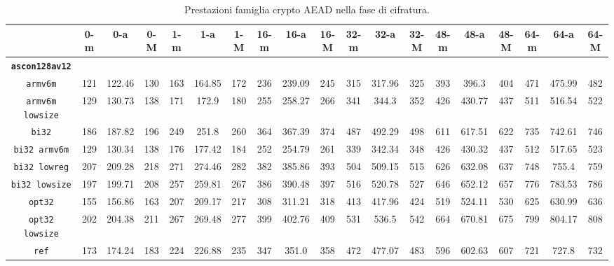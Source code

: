 \begin{landscape}
    \begin{table}[]
        \caption{Prestazioni famiglia crypto AEAD nella fase di cifratura.}
        \begin{adjustbox}{width=600pt}
            \centering
			\begin{tabular}{|c|c|c|c|c|c|c|c|c|c|c|c|c|c|c|c|c|c|c|}
				\hline
				& \textbf{0-m} & \textbf{0-a} & \textbf{0-M} & \textbf{1-m} & \textbf{1-a} & \textbf{1-M} & \textbf{16-m} & \textbf{16-a} & \textbf{16-M} & \textbf{32-m} & \textbf{32-a} & \textbf{32-M} & \textbf{48-m} & \textbf{48-a} & \textbf{48-M} & \textbf{64-m} & \textbf{64-a} & \textbf{64-M} \\
				\hline
				\texttt{\textbf{ascon128av12}} & & & & & & & & & & & & & & & & & & \\
				\hline
				\texttt{armv6m} & 121 & 122.46 & 130 & 163 & 164.85 & 172 & 236 & 239.09 & 245 & 315 & 317.96 & 325 & 393 & 396.3 & 404 & 471 & 475.99 & 482 \\
				\hline
				\texttt{armv6m lowsize} & 129 & 130.73 & 138 & 171 & 172.9 & 180 & 255 & 258.27 & 266 & 341 & 344.3 & 352 & 426 & 430.77 & 437 & 511 & 516.54 & 522 \\
				\hline
				\texttt{bi32} & 186 & 187.82 & 196 & 249 & 251.8 & 260 & 364 & 367.39 & 374 & 487 & 492.29 & 498 & 611 & 617.51 & 622 & 735 & 742.61 & 746 \\
				\hline
				\texttt{bi32 armv6m} & 129 & 130.34 & 138 & 176 & 177.42 & 184 & 252 & 254.79 & 261 & 339 & 342.34 & 348 & 426 & 430.32 & 437 & 512 & 517.65 & 523 \\
				\hline
				\texttt{bi32 lowreg} & 207 & 209.28 & 218 & 271 & 274.46 & 282 & 382 & 385.86 & 393 & 504 & 509.15 & 515 & 626 & 632.08 & 637 & 748 & 755.4 & 759 \\
				\hline
				\texttt{bi32 lowsize} & 197 & 199.71 & 208 & 257 & 259.81 & 267 & 386 & 390.48 & 397 & 516 & 520.78 & 527 & 646 & 652.12 & 657 & 776 & 783.53 & 786 \\
				\hline
				\texttt{opt32} & 155 & 156.86 & 163 & 207 & 209.17 & 217 & 308 & 311.21 & 318 & 413 & 417.96 & 424 & 519 & 524.11 & 530 & 625 & 630.99 & 636 \\
				\hline
				\texttt{opt32 lowsize} & 202 & 204.38 & 211 & 267 & 269.48 & 277 & 399 & 402.76 & 409 & 531 & 536.5 & 542 & 664 & 670.81 & 675 & 799 & 804.17 & 808 \\
				\hline
				\texttt{ref} & 173 & 174.24 & 183 & 224 & 226.88 & 235 & 347 & 351.0 & 358 & 472 & 477.07 & 483 & 596 & 602.63 & 607 & 721 & 727.8 & 732 \\

\end{tabular}
\end{adjustbox}
\end{table}
\end{landscape}
